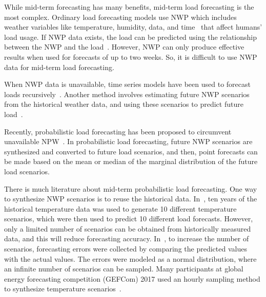 \documentclass[journal]{IEEEtran} %
\begin{document}
While mid-term forecasting has many benefits, mid-term load forecasting is the most complex. Ordinary load forecasting models use NWP which includes weather variables like temperature, humidity, data, and time~\cite{xie2016temperature} that affect humans' load usage. If NWP data exists, the load can be predicted using the relationship between the NWP and the load~\cite{bacher2013short}. However, NWP can only produce effective results when used for forecasts of up to two weeks. So, it is difficult to use NWP data for mid-term load forecasting. 

When NWP data is unavailable, time series models have been used to forecast loads recursively~\cite{TIMESERIES}. Another method involves estimating future NWP scenarios from the historical weather data, and using these scenarios to predict future load~\cite{xie2016temperature}. 

Recently, probabilistic load forecasting has been proposed to circumvent unavailable NPW~\cite{xie2016temperature}. In probabilistic load forecasting, future NWP scenarios are synthesized and converted to future load scenarios, and then, point forecasts can be made based on the mean or median of the marginal distribution of the future load scenarios.


There is much literature about mid-term probabilistic load forecasting. One way to synthesize NWP scenarios is to reuse the historical data. In~\cite{Tao2014}, ten years of the historical temperature data was used to generate 10 different temperature scenarios, which were then used to predict 10 different load forecasts. However, only a limited number of scenarios can be obtained from historically measured data, and this will reduce forecasting accuracy. In~\cite{Jingrui2015}, to increase the number of scenarios, forecasting errors were collected by comparing the predicted values with the actual values. The errors were modeled as a normal distribution, where an infinite number of scenarios can be sampled.  Many participants at global energy forecasting competition  (GEFCom) 2017 used an hourly sampling method to synthesize temperature scenarios~\cite{hong2019global}. 
\end{document}
